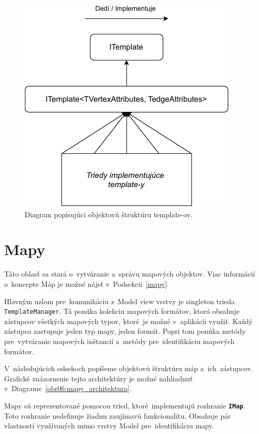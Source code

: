 \begin{figure}[h]\centering
\includegraphics[]{img/templatey_architektura}
\caption{Diagram popisujúci objektovú štruktúru template-ov.} 
\label{obr05:templatey_architektura}
\end{figure}

\section{Mapy}

Táto oblasť sa stará o~vytváranie a~správu mapových objektov. Viac informácií o~koncepte Máp je možné nájsť v~Podsekcii~\ref{mapy}.

Hlavným uzlom pre~komunikáciu z~Model view vrstvy je singleton trieda \texttt{TemplateManager}. Tá ponúka kolekciu mapových formátov, ktorá obsahuje zástupcov všetkých mapových typov, ktoré~je možné v~aplikácii využiť. Každý zástupca zastupuje jeden typ mapy, jeden formát. Popri tom ponúka metódy pre~vytváranie mapových inštancií a~metódy pre~identifikáciu mapových formátov. 

V~následujúcich odsekoch popíšeme objektovú štruktúru máp a~ich~zástupcov. Grafické znázornenie tejto architektúry je možné nahliadnuť v~Diagrame~\ref{obr06:mapy_architektura}.   

\bigskip

Mapy sú reprezentované pomocou tried, ktoré~implementujú rozhranie \textbf{\texttt{IMap}}. Toto rozhranie nedefinuje žiadnu zaujímavú funkcionalitu. Obsahuje pár vlastností využívaných mimo vrstvy Model pre~identifikáciu mapy.

